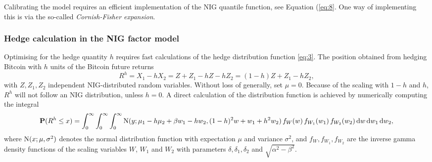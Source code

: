 Calibrating the model requires an efficient implementation of the NIG
quantile function, see Equation (\ref{eq:8}. One way of implementing
this is via the so-called {\em Cornish-Fisher expansion}.




\subsubsection{Hedge calculation in the NIG factor model}
\label{sec:hedge-calc-nig}

Optimising for the hedge quantity $h$ requires fast calculations of
the hedge distribution function \eqref{eq:3}. The position obtained
from hedging Bitcoin with $h$ units of the Bitcoin future returns
\begin{equation*}
  R^h = X_1 - h X_2 = Z + Z_1 - h Z - h Z_2 = (1-h) Z + Z_1 - h Z_2,
\end{equation*}
with $Z, Z_1, Z_2$ independent NIG-distributed random
variables. Without loss of generally, set $\mu=0$. Because of the
scaling with $1-h$ and $h$, $R^h$ will not follow an NIG distribution,
unless $h=0$.  A direct calculation of the distribution function is
achieved by numerically computing the integral
\begin{equation*}
  {\bf P}(R^h\leq x) = \int_0^\infty \int_0^\infty \int_0^\infty
  {\rm N}(y; \mu_1 - h \mu_2 + \beta w_1 - h w_2, (1-h)^2 w + w_1 + h^2
  w_2)\, f_W(w)\, f_{W_1}(w_1)\, f_{W_2} (w_2)\, {\rm d} w\, {\rm d} w_1\, {\rm d} w_2,
\end{equation*}
where ${\rm N}(x; \mu, \sigma^2)$ denotes the normal distribution
function with expectation $\mu$ and variance $\sigma^2$, and
$f_W, f_{W_1}, f_{W_2}$ are the inverse gamma density functions of the
scaling variables $W$, $W_1$ and $W_2$ with parameters
$\delta, \delta_1, \delta_2$ and $\sqrt{\alpha^2-\beta^2}$. 

